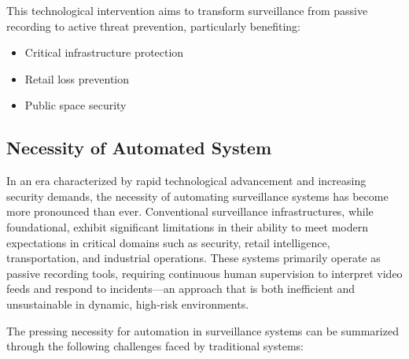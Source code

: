 \documentclass[12pt]{report}
\begin{document}
This technological intervention aims to transform surveillance from passive recording to active threat prevention, particularly benefiting:
\begin{itemize}
    \item Critical infrastructure protection
    \item Retail loss prevention
    \item Public space security
\end{itemize}
\subsection{Necessity of Automated System}

In an era characterized by rapid technological advancement and increasing security demands, the necessity of automating surveillance systems has become more pronounced than ever. Conventional surveillance infrastructures, while foundational, exhibit significant limitations in their ability to meet modern expectations in critical domains such as security, retail intelligence, transportation, and industrial operations. These systems primarily operate as passive recording tools, requiring continuous human supervision to interpret video feeds and respond to incidents—an approach that is both inefficient and unsustainable in dynamic, high-risk environments.

The pressing necessity for automation in surveillance systems can be summarized through the following challenges faced by traditional systems:
\end{document}

